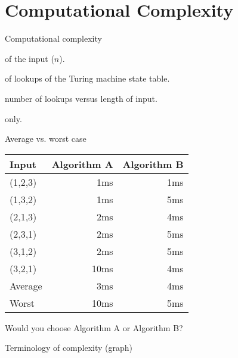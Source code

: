 \documentclass{beamer}
\begin{document}
\section{Computational Complexity}

\begin{frame}{Computational complexity}
  \begin{description}
    \setlength\itemsep{6mm}
    \item[Length] of the input ($n$).
    \item[Number] of lookups of the Turing machine state table.
    \item[Function:] number of lookups versus length of input.
    \item[Worst case] only.
  \end{description}
\end{frame}


\begin{frame}{Average vs. worst case}
  \begin{table}
    \begin{tabular}{p{2cm}rr}
      Input & Algorithm A & \hspace{1cm} Algorithm B \\
      \hline
      (1,2,3) &  1ms &  1ms \\
      (1,3,2) &  1ms &  5ms \\
      (2,1,3) &  2ms &  4ms \\
      (2,3,1) &  2ms &  5ms \\
      (3,1,2) &  2ms &  5ms \\
      (3,2,1) & 10ms &  4ms \\
      \hline
      Average &  3ms &  4ms \\
      Worst   & 10ms &  5ms
    \end{tabular}
  \end{table}
  \begin{center}
    Would you choose Algorithm A or Algorithm B?
  \end{center}
\end{frame}


\begin{frame}[fragile]{Terminology of complexity (graph)}
  \begin{center}
  \end{center}
\end{frame}
  
\end{document}
